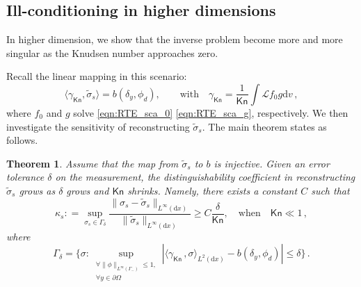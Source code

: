 \documentclass[english,reqno]{amsart}
\theoremstyle{plain}
\newtheorem{theorem}{Theorem}
\theoremstyle{definition} %
\newcommand{\average}[1]{ \langle#1 \rangle}
\newcommand{\opL}{\mathcal{L}}
\newcommand{\rd}{\mathrm{d}}
\newcommand{\Kn}{\mathsf{Kn}}
\begin{document}
\subsection{Ill-conditioning in higher dimensions}
In higher dimension, we show that the inverse problem become more and more singular as the Knudsen number approaches zero. 

Recall the linear mapping in this scenario:
\begin{equation*}
\average{\gamma_{\Kn}, \tilde{\sigma}_s} =  b(\delta_y, \phi_d), \qquad \text{with} \quad 
\gamma_{\Kn} = \frac{1}{\Kn}\int \opL f_0 g \rd{v}\,, 
\end{equation*}
where $f_0$ and $g$ solve \eqref{eqn:RTE_sca_0} \eqref{eqn:RTE_sca_g}, respectively. We then investigate the sensitivity of reconstructing $\tilde{\sigma}_s$. The main theorem states as follows. 
\begin{theorem}\label{thm:Dis-crit}
Assume that the map from $\tilde{\sigma}_s$ to $b$ is injective. Given an error tolerance $\delta$ on the measurement, the distinguishability coefficient in reconstructing $\tilde{\sigma}_s$ grows as $\delta$ grows and $\Kn$ shrinks. Namely, there exists a constant $C$ such that
\begin{equation}\label{eqn:Dis}
\kappa_s : = \sup_{\sigma_s \in \Gamma_\delta} \frac{\| \sigma_s - \tilde{\sigma}_s \|_{L^\infty(\rd{x})}}{ \| \tilde{\sigma}_s \|_{L^\infty(\rd{x})}} \geq C\frac{\delta}{\Kn} ,\quad \text{when} \quad \Kn\ll 1\,,
\end{equation}
where 
\[
\Gamma_\delta =\{ \sigma: \sup_{\substack{\forall \|\phi\|_{L^\infty(\Gamma_-)}\leq 1,\\ \forall y\in \partial\Omega}} |\langle\gamma_\Kn\,,\sigma\rangle_{L^2(\rd{x})} - b(\delta_y,\phi_d)|\leq \delta  \} \,.
\]
\end{theorem}
\end{document}
